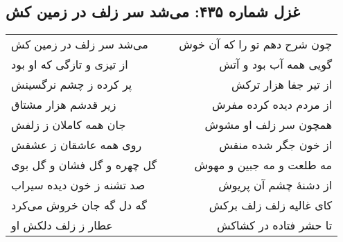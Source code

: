 \begin{center}
\section*{غزل شماره ۴۳۵: می‌شد سر زلف در زمین کش}
\label{sec:435}
\begin{longtable}{l p{0.5cm} r}
می‌شد سر زلف در زمین کش
&&
چون شرح دهم تو را که آن خوش
\\
از تیزی و تازگی که او بود
&&
گویی همه آب بود و آتش
\\
پر کرده ز چشم نرگسینش
&&
از تیر جفا هزار ترکش
\\
زیر قدشم هزار مشتاق
&&
از مردم دیده کرده مفرش
\\
جان همه کاملان ز زلفش
&&
همچون سر زلف او مشوش
\\
روی همه عاشقان ز عشقش
&&
از خون جگر شده منقش
\\
گل چهره و گل فشان و گل بوی
&&
مه طلعت و مه جبین و مهوش
\\
صد تشنه ز خون دیده سیراب
&&
از دشنهٔ چشم آن پریوش
\\
گه دل گه جان خروش می‌کرد
&&
کای غالیه زلف زلف برکش
\\
عطار ز زلف دلکش او
&&
تا حشر فتاده در کشاکش
\\
\end{longtable}
\end{center}
